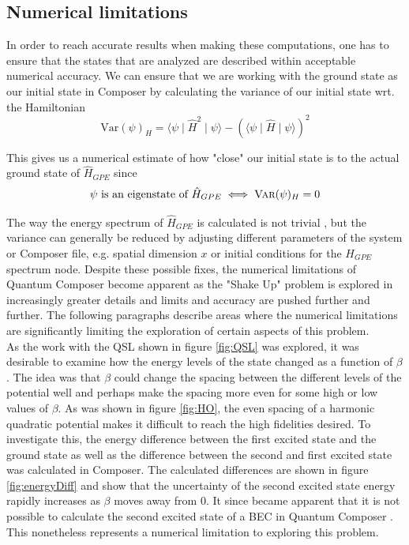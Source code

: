 \documentclass[aps,pra,reprint,superscriptaddress]{revtex4-1}
\begin{document}
\subsection{\label{subsec:numericalLimitations} Numerical limitations}
In order to reach accurate results when making these computations, one has to ensure that the states that are analyzed are described within acceptable numerical accuracy. We can ensure that we are working with the ground state as our initial state in Composer by calculating the variance of our initial state wrt. the Hamiltonian
\begin{equation}
	\text{Var}(\psi)_H = \langle \psi \mid \hat{H}^2 \mid \psi \rangle - (\langle \psi \mid \hat{H} \mid \psi \rangle)^2
\end{equation}

This gives us a numerical estimate of how "close" our initial state is to the actual ground state of $\hat{H}_{GPE}$ since
\begin{equation}
	\psi \text{ is an eigenstate of } \hat{H}_{GPE} \iff \textsc{Var}(\psi)_H = 0
\end{equation}

The way the energy spectrum of $\hat{H}_{GPE}$ is calculated is not trivial \cite{QEngine}, but the variance can generally be reduced by adjusting different parameters of the system or Composer file, e.g. spatial dimension $x$ or initial conditions for the $H_{GPE}$ spectrum node. Despite these possible fixes, the numerical limitations of Quantum Composer become apparent as the "Shake Up" problem is explored in increasingly greater details and limits and accuracy are pushed further and further. The following paragraphs describe areas where the numerical limitations are significantly limiting the exploration of certain aspects of this problem.\\

As the work with the QSL shown in figure \ref{fig:QSL} was explored, it was desirable to examine how the energy levels of the state changed as a function of $\beta$. The idea was that $\beta$ could change the spacing between the different levels of the potential well and perhaps make the spacing more even for some high or low values of $\beta$. As was shown in figure \ref{fig:HO}, the even spacing of a harmonic quadratic potential makes it difficult to reach the high fidelities desired. To investigate this, the energy difference between the first excited state and the ground state as well as the difference between the second and first excited state was calculated in Composer. The calculated differences are shown in figure \ref{fig:energyDiff} and show that the uncertainty of the second excited state energy rapidly increases as $\beta$ moves away from $0$. It since became apparent that it is not possible to calculate the second excited state of a BEC in Quantum Composer \cite{QEngine}. This nonetheless represents a numerical limitation to exploring this problem. \\
\end{document}
